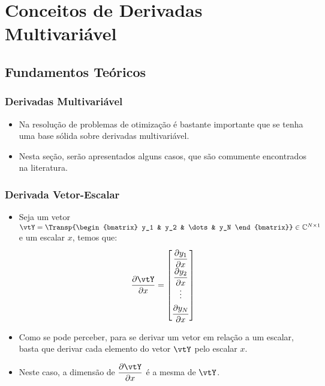 
\section{Conceitos de Derivadas Multivariável}


\subsection{Fundamentos Teóricos}

\begin{frame}
	\frametitle{\normalsize Derivadas Multivariável}
	\begin{itemize}
		\item Na resolução de problemas de otimização é bastante importante que se tenha uma base sólida sobre derivadas multivariável.
		\item Nesta seção, serão apresentados alguns casos, que são comumente encontrados na literatura.
	\end{itemize}
\end{frame}

\begin{frame}
	\frametitle{\normalsize Derivada Vetor-Escalar}
	\begin{itemize}
		\item Seja um vetor $\vtY = \Transp{\begin{bmatrix} y_1 & y_2 & \dots & y_N \end{bmatrix}} \in \mathbb{C}^{N \times 1}$ e um escalar $x$, temos que:
		\[\renewcommand{\arraystretch}{1.8}
			\dfrac{\partial \vtY}{\partial x} = \begin{bmatrix} 
				\dfrac{\partial y_1}{\partial x} \\
				\dfrac{\partial y_2}{\partial x} \\ 
				\vdots \\ 
				\dfrac{\partial y_N}{\partial x} 
			\end{bmatrix}
		\]
		\item Como se pode perceber, para se derivar um vetor em relação a um escalar, basta que derivar cada elemento do vetor $\vtY$ pelo escalar $x$.
		\item Neste caso, a dimensão de $\dfrac{\partial \vtY}{\partial x}$ é a mesma de $\vtY$.
	\end{itemize}
\end{frame}

